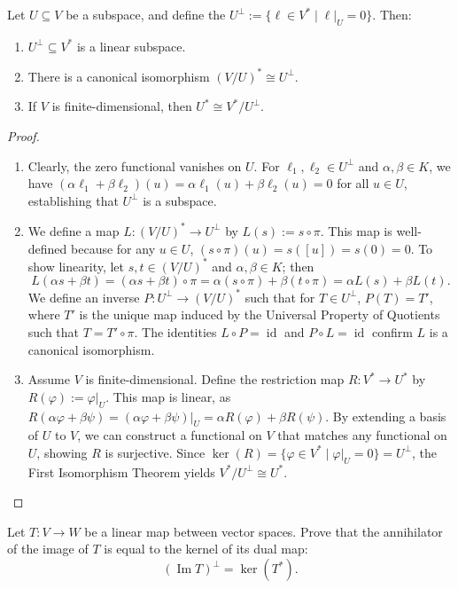
\begin{proposition}
  Let $U \subseteq V$ be a subspace, and define the  $U^\perp := \{\ell \in V^* \mid \ell|_U = 0\}$. Then:
  \begin{enumerate}
    \item $U^\perp \subseteq V^*$ is a linear subspace.
    \item There is a canonical isomorphism $(V/U)^* \cong U^\perp$.
    \item If $V$ is finite-dimensional, then $U^* \cong V^*/U^\perp$.
  \end{enumerate}
\end{proposition}

\begin{proof}
  \begin{enumerate}
    \item Clearly, the zero functional vanishes on $U$. For $\ell_1, \ell_2 \in U^\perp$ and $\alpha, \beta \in K$, we have $(\alpha \ell_1 + \beta \ell_2)(u) = \alpha \ell_1(u) + \beta \ell_2(u) = 0$ for all $u \in U$, establishing that $U^\perp$ is a subspace.

    \item We define a map $L \colon (V/U)^* \to U^\perp$ by $L(s) := s \circ \pi$. This map is well-defined because for any $u \in U$, $(s \circ \pi)(u) = s([u]) = s(0) = 0$. To show linearity, let $s, t \in (V/U)^*$ and $\alpha, \beta \in K$; then
    \[ L(\alpha s + \beta t) = (\alpha s + \beta t) \circ \pi = \alpha(s \circ \pi) + \beta(t \circ \pi) = \alpha L(s) + \beta L(t). \]
    We define an inverse $P \colon U^\perp \to (V/U)^*$ such that for $T \in U^\perp$, $P(T) = T'$, where $T'$ is the unique map induced by the Universal Property of Quotients such that $T = T' \circ \pi$. The identities $L \circ P = \operatorname{id}$ and $P \circ L = \operatorname{id}$ confirm $L$ is a canonical isomorphism.

    \item Assume $V$ is finite-dimensional. Define the restriction map $R \colon V^* \to U^*$ by $R(\varphi) := \varphi|_U$. This map is linear, as $R(\alpha \varphi + \beta \psi) = (\alpha \varphi + \beta \psi)|_U = \alpha R(\varphi) + \beta R(\psi)$. By extending a basis of $U$ to $V$, we can construct a functional on $V$ that matches any functional on $U$, showing $R$ is surjective. Since $\ker(R) = \{\varphi \in V^* \mid \varphi|_U = 0\} = U^\perp$, the First Isomorphism Theorem yields $V^*/U^\perp \cong U^*$.
  \end{enumerate}
\end{proof}

\begin{exercise}
  Let $T \colon V \to W$ be a linear map between vector spaces. Prove that the annihilator of the image of $T$ is equal to the kernel of its dual map:
  \[ (\operatorname{Im} T)^\perp = \ker(T^*). \]
\end{exercise}